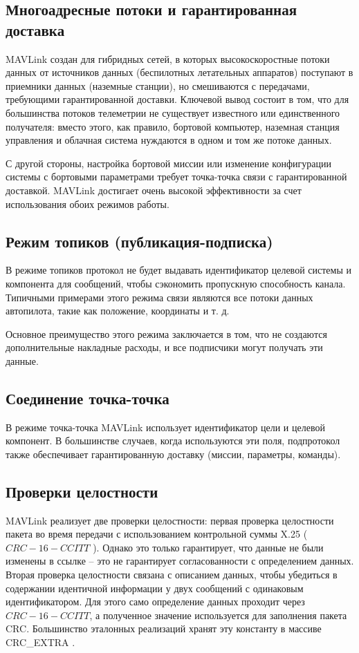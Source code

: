\subsection{Многоадресные потоки и гарантированная доставка}
MAVLink создан для гибридных сетей, в которых высокоскоростные потоки данных от источников данных (беспилотных летательных аппаратов) поступают в приемники данных (наземные станции), но смешиваются с передачами, требующими гарантированной доставки. Ключевой вывод состоит в том, что для большинства потоков телеметрии не существует известного или единственного получателя: вместо этого, как правило, бортовой компьютер, наземная станция управления и облачная система нуждаются в одном и том же потоке данных.

С другой стороны, настройка бортовой миссии или изменение конфигурации системы с бортовыми параметрами требует точка-точка связи с гарантированной доставкой. MAVLink достигает очень высокой эффективности за счет использования обоих режимов работы.

\subsection{Режим топиков (публикация-подписка)}
В режиме топиков протокол не будет выдавать идентификатор целевой системы и компонента для сообщений, чтобы сэкономить пропускную способность канала. Типичными примерами этого режима связи являются все потоки данных автопилота, такие как положение, координаты и т. д.

Основное преимущество этого режима заключается в том, что не создаются дополнительные накладные расходы, и все подписчики могут получать эти данные.

\subsection{Соединение точка-точка}%

В режиме точка-точка MAV\-Link использует идентификатор цели и целевой компонент. В большинстве случаев, когда используются эти поля, подпротокол также обеспечивает гарантированную доставку (миссии, параметры, команды).

\subsection{Проверки целостности}
MAV\-Link реализует две проверки целостности: первая проверка целостности пакета во время передачи с использованием контрольной суммы X.25 ( $CRC-16-CCITT$ ). Однако это только гарантирует, что данные не были изменены в ссылке -- это не гарантирует согласованности с определением данных. Вторая проверка целостности связана с описанием данных, чтобы убедиться в содержании идентичной информации у двух сообщений с одинаковым идентификатором. Для этого само определение данных проходит через $CRC-16-CCITT$, а полученное значение используется для заполнения пакета CRC. Большинство эталонных реализаций хранят эту константу в массиве CRC\_EXTRA \cite{mavlink}.

